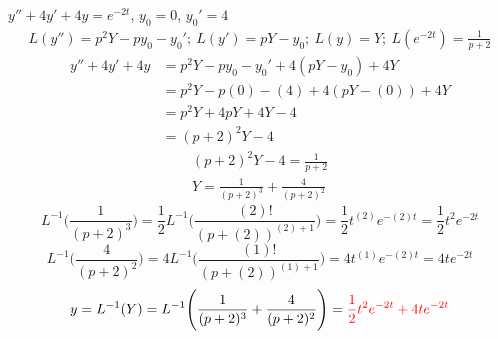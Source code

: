 \item [3.] $y''+4y'+4y=e^{-2t}$, $y_0=0$, $y_0'=4$
\begin{gather*}
    L(y'')=p^2Y-py_0-y_0';\:
    L(y')=pY-y_0;\:
    L(y)=Y;\:
    L(e^{-2t})=\frac{1}{p+2}
\end{gather*}
\begin{align*}
    y''+4y'+4y
    &=p^2Y-py_0-y_0'+4(pY-y_0)+4Y\\
    &=p^2Y-p(0)-(4)+4(pY-(0))+4Y\\
    &=p^2Y+4pY+4Y-4\\
    &=(p+2)^2Y-4
\end{align*}
\begin{gather*}
    (p+2)^2Y-4=\frac{1}{p+2}\\
    Y=\frac{1}{(p+2)^3}+\frac{4}{(p+2)^2}
\end{gather*}
\begin{equation*}
    L^{-1}\Bigg(\frac{1}{(p+2)^3}\Bigg) 
    = \frac{1}{2}L^{-1}\Bigg(\frac{(2)!}{(p+(2))^{(2)+1}}\Bigg) 
    =\frac{1}{2}t^{(2)}e^{-(2)t}
    =\frac{1}{2}t^2e^{-2t}
    \tag{By \( L6 \)}
\end{equation*}
\begin{equation*}
    L^{-1}\Bigg(\frac{4}{(p+2)^2}\Bigg) 
    = 4L^{-1}\Bigg(\frac{(1)!}{(p+(2))^{(1)+1}}\Bigg)
    =4t^{(1)}e^{-(2)t}
    =4te^{-2t}
    \tag{By \( L6 \)}
\end{equation*}
\begin{gather*}
    y=L^{-1}(Y)=L^{-1}
    \Bigg(
    \frac{1}{(p+2)^3}+\frac{4}{(p+2)^2}
    \Bigg)=\textcolor{red}{\frac{1}{2}t^2e^{-2t}+4te^{-2t}}
\end{gather*}
